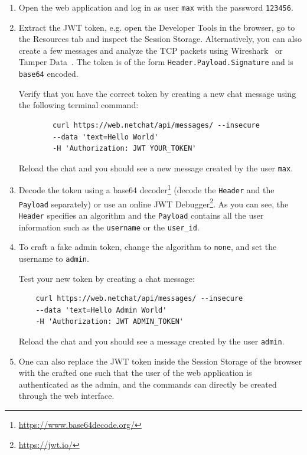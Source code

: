 \documentclass[12pt,a4paper]{article}
\newcommand{\code}[1]{\texttt{#1}}
\begin{document}
\begin{enumerate}
	\item Open the web application and log in as user \code{max} with the password \code{123456}.
	\item Extract the JWT token, e.g. open the Developer Tools in the browser, go to the Resources tab and inspect the Session Storage. Alternatively, you can also create a few messages and analyze the TCP packets using Wireshark~\cite{wireshark} or Tamper Data~\cite{tamperdata}. The token is of the form \code{Header.Payload.Signature} and is \code{base64} encoded.
	
	Verify that you have the correct token by creating a new chat message using the following terminal command: 
	\begin{verbatim}
		curl https://web.netchat/api/messages/ --insecure
		--data 'text=Hello World'
		-H 'Authorization: JWT YOUR_TOKEN'
	\end{verbatim}
	
	Reload the chat and you should see a new message created by the user \code{max}.
	
	\item Decode the token using a base64 decoder\footnote{\url{https://www.base64decode.org/}} (decode the \code{Header} and the \code{Payload} separately) or use an online JWT Debugger\footnote{\url{https://jwt.io/}}. As you can see, the \code{Header} specifies an algorithm and the \code{Payload} contains all the user information such as the \code{username} or the \code{user\_id}. 
	\item To craft a fake admin token, change the algorithm to \code{none}, and set the username to \code{admin}.
	
	Test your new token by creating a chat message:
	\begin{verbatim}
	curl https://web.netchat/api/messages/ --insecure
	--data 'text=Hello Admin World'
	-H 'Authorization: JWT ADMIN_TOKEN'
	\end{verbatim}
	
	Reload the chat and you should see a message created by the user \code{admin}.
	
	\item One can also replace the JWT token inside the Session Storage of the browser with the crafted one such that the user of the web application is authenticated as the admin, and the commands can directly be created through the web interface.
	 
\end{enumerate}
\end{document}
